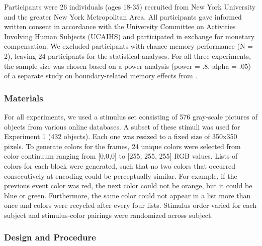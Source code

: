 Participants were 26 individuals (ages 18-35) recruited from New York
University and the greater New York Metropolitan Area. All participants
gave informed written consent in accordance with the University
Committee on Activities Involving Human Subjects (UCAIHS) and
participated in exchange for monetary compensation. We excluded
participants with chance memory performance (N = 2), leaving 24
participants for the statistical analyses. For all three experiments,
the sample size was chosen based on a power analysis (power = .8, alpha
= .05) of a separate study on boundary-related memory effects from
\textcite{dubrow_influence_2013}.

\subsubsection{Materials}\label{materials}

For all experiments, we used a stimulus set consisting of 576 gray-scale
pictures of objects from various online databases. A subset of these
stimuli was used for Experiment 1 (432 objects). Each one was resized to
a fixed size of 350x350 pixels. To generate colors for the frames, 24
unique colors were selected from color continuum ranging from
{[}0,0,0{]} to {[}255, 255, 255{]} RGB values. Lists of colors for each
block were generated, such that no two colors that occurred
consecutively at encoding could be perceptually similar. For example, if
the previous event color was red, the next color could not be orange,
but it could be blue or green. Furthermore, the same color could not
appear in a list more than once and colors were recycled after every
four lists. Stimulus order varied for each subject and stimulus-color
pairings were randomized across subject.

\subsubsection{Design and Procedure}\label{design-and-procedure}

